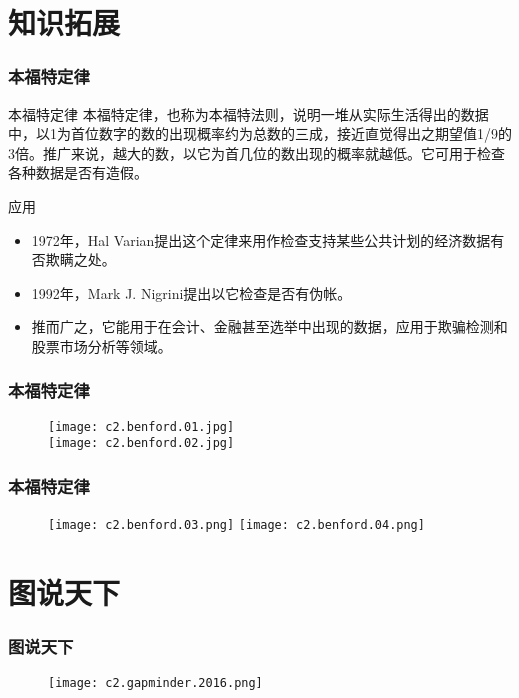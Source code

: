 \section{知识拓展}
\begin{frame}
  \frametitle{本福特定律}
  \begin{block}{本福特定律}
本福特定律，也称为本福特法则，说明一堆从实际生活得出的数据中，以1为首位数字的数的出现概率约为总数的三成，接近直觉得出之期望值1/9的3倍。推广来说，越大的数，以它为首几位的数出现的概率就越低。它可用于检查各种数据是否有造假。
  \end{block}
  \pause
  \begin{block}{应用}
    \begin{itemize}
      \item 1972年，Hal Varian提出这个定律来用作检查支持某些公共计划的经济数据有否欺瞒之处。
      \item 1992年，Mark J. Nigrini提出以它检查是否有伪帐。
      \item 推而广之，它能用于在会计、金融甚至选举中出现的数据，应用于欺骗检测和股票市场分析等领域。
    \end{itemize}
  \end{block}
\end{frame}

\begin{frame}
  \frametitle{本福特定律}
  \begin{figure}
    \centering
    \texttt{[image: c2.benford.01.jpg]}\\
    \texttt{[image: c2.benford.02.jpg]}
  \end{figure}
\end{frame}

\begin{frame}
  \frametitle{本福特定律}
  \begin{figure}
    \centering
    \texttt{[image: c2.benford.03.png]}
    \texttt{[image: c2.benford.04.png]}
  \end{figure}
\end{frame}

\section{图说天下}
\begin{frame}
  \frametitle{图说天下}
  \begin{figure}
    \centering
    \texttt{[image: c2.gapminder.2016.png]}
  \end{figure}
\end{frame}

